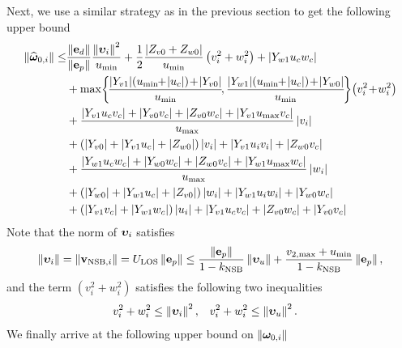Next, we use a similar strategy as in the previous section to get the following upper bound
\begin{align}
    \norm{\widehat{\bs{\omega}}_{0, i}} \leq &
    \frac{\norm{\mat{e}_d}}{\norm{\mat{e}_p}}\frac{\norm{\bvel_i}^2}{u_{\rm min}} + \frac{1}{2}\frac{\abs{Z_{v0} + Z_{w0}}}{u_{\min}}\left(v_i^2 + w_i^2\right)
    + \abs{Y_{w1}u_cw_c} \nonumber \\
    &+ \max\!\left\{\!\frac{\abs{Y_{v1}}\!\left(u_{\min\!}\!+\!\abs{u_c}\right)\! + \!\abs{Y_{v0}}}{u_{\min}}\!, \frac{\abs{Y_{w1}}\!\left(u_{\min\!}\!+\!\abs{u_c}\right)\! +\! \abs{Y_{w0}}}{u_{\min}}\!\right\}\!\left(v_i^2\! + \!w_i^2\right) \nonumber \\
    &+ \frac{\abs{Y_{v1}u_cv_c} + \abs{Y_{v0}v_c} + \abs{Z_{v0}w_c} + \abs{Y_{v1}u_{\max}v_c}}{u_{\max}}\abs{v_i} \nonumber \\
    & + \left(\abs{Y_{v0}} + \abs{Y_{v1}u_c} + \abs{Z_{w0}}\right)\abs{v_i} + \abs{Y_{v1}u_iv_i} + \abs{Z_{w0}v_c} \nonumber \\
    &+ \frac{\abs{Y_{w1}u_cw_c} + \abs{Y_{w0}w_c} + \abs{Z_{w0}v_c} + \abs{Y_{w1}u_{\max}w_c}}{u_{\max}}\abs{w_i} \nonumber \\
    & + \left(\abs{Y_{w0}} + \abs{Y_{w1}u_c} + \abs{Z_{v0}}\right)\abs{w_i} + \abs{Y_{w1}u_iw_i} + \abs{Y_{w0}w_c} \nonumber \\
    &+ \left(\abs{Y_{v1}v_c}+\abs{Y_{w1}w_c}\right)\abs{u_i} + \abs{Y_{v1}u_cv_c} + \abs{Z_{v0}w_c} + \abs{Y_{v0}v_c}
\end{align}
Note that the norm of $\bm{\upsilon}_i$ satisfies
\begin{equation}
    \left\|\bm{\upsilon}_i\right\| = \left\|\mathbf{v}_{{\rm NSB}, i}\right\| = U_{\rm LOS}\left\|\mathbf{e}_p\right\|
    \leq \frac{\left\|\mathbf{e}_p\right\|}{1 - k_{\rm NSB}}\left\|\bm{\upsilon}_u\right\| + \frac{v_{2, \max} + u_{\min}}{1 - k_{\rm NSB}}\left\|\mathbf{e}_p\right\|,
\end{equation}
and the term $\left(v_i^2+w_i^2\right)$ satisfies the following two inequalities
\begin{align}
    v_i^2+w_i^2 &\leq \left\|\bm{\upsilon}_i\right\|^2, &
    v_i^2+w_i^2 &\leq \left\|\bm{\upsilon}_u\right\|^2.
\end{align}
We finally arrive at the following upper bound on $\left\|\bm{\omega}_{0, i}\right\|$
